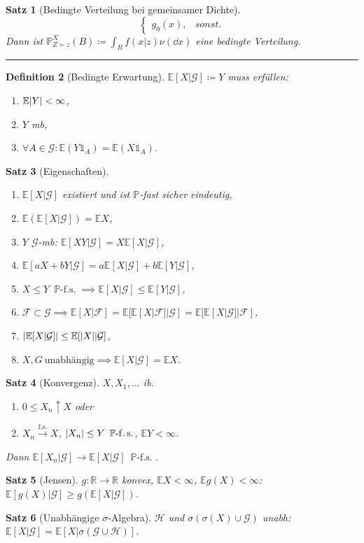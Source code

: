 \documentclass[a4paper,8pt]{article}
\newcounter{Sec}
\theoremstyle{nonumberbreak}
\newtheorem{definition}{Definition}[Sec]
\newtheorem{satz}[definition]{Satz}
\newcommand{\sep}{%
	\rule{\linewidth}{0.15pt}%
	\stepcounter{Sec}%
	}
\newcommand{\defas}{\coloneqq}
\newcommand{\ind}{\mathds{1}}
\renewcommand{\P}{\mathbb{P}}
\newcommand{\R}{\mathbb{R}}
\newcommand{\E}{\mathbb{E}}
\newcommand{\BE}[2]{\E[#1|\mathcal{#2}]}
\newcommand{\fsk}{\mathrel{\stackrel{\operatorname{f.s.}}{\longrightarrow}}}
\newcommand{\fs}[1]{~\operatorname{#1-f.s.}}
\begin{document}
\begin{multicols*}{3}
\begin{satz}[Bedingte Verteilung bei gemeinsamer Dichte]
\[\begin{cases*}
				g_0(x), &sonst.
			\end{cases*}
		\]
		Dann ist $\P^X_{Z=z}(B)\defas\int_Bf(x|z)\nu(\dd{x})$ eine bedingte Verteilung.
	\end{satz}
	\sep
	\begin{definition}[Bedingte Erwartung]
		$\BE{X}{G}\defas Y$ muss erfüllen:
		\begin{enumerate}[label=(\alph*)]
			\item $\E\abs{Y}<\infty$,
			\item $Y$ mb,
			\item $\forall A\in\mathcal{G}:\E(Y\ind_A)=\E(X\ind_A)$.
		\end{enumerate}
	\end{definition}
	\begin{satz}[Eigenschaften]
		\begin{enumerate}[label=(\alph*)]
			\item $\BE{X}{G}$ existiert und ist $\P$-fast sicher eindeutig,
			\item $\E(\BE{X}{G})=\E X$,
			\item $Y$ $\mathcal{G}$-mb: $\BE{XY}{G}=X\BE{X}{G}$,
			\item $\BE{aX+bY}{G}=a\BE{X}{G}+b\BE{Y}{G}$,
			\item $X\leq Y\fs{\P}\implies\BE{X}{G}\leq\BE{Y}{G}$,
			\item $\mathcal{F}\subset\mathcal{G}\implies \BE{X}{F}=\BE{\BE{X}{F}}{G}=\BE{\BE{X}{G}}{F}$,
			\item $\abs{\BE{X}{G}}\leq\BE{\abs{X}}{G}$,
			\item $X, G~\text{unabhängig}\implies\BE{X}{G}=\E X$.
		\end{enumerate}
	\end{satz}
	\begin{satz}[Konvergenz]
		$X, X_1,\ldots$ ib.
		\begin{enumerate}[label=(\alph*)]
			\item $0\leq X_n\uparrow X$ oder
			\item $X_n\fsk X$, $\abs{X_n}\leq Y\fs{\P}$, $\E Y<\infty$.
		\end{enumerate}
		Dann $\BE{X_n}{G}\to\BE{X}{G}\fs{\P}$.
	\end{satz}
	\begin{satz}[Jensen]
		$g\colon\R\to\R$ konvex, $\E X<\infty$, $\E g(X)<\infty$: $\BE{g(X)}{G}\geq g(\BE{X}{G})$.
	\end{satz}
	\begin{satz}[Unabhängige $\sigma$-Algebra]
		$\mathcal{H}$ und $\sigma(\sigma(X)\cup\mathcal{G})$ unabh: $\BE{X}{G}=\E[X|\sigma(\mathcal{G}\cup\mathcal{H})]$.
	\end{satz}

\end{multicols*}
\end{document}
